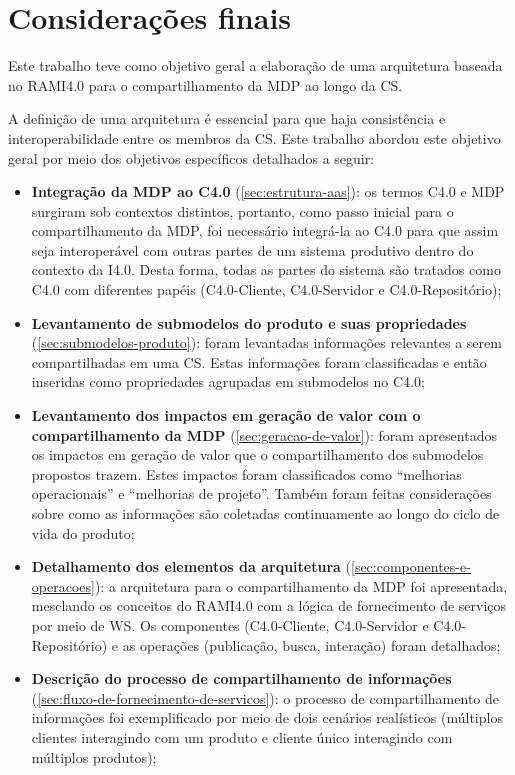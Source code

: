 \chapter{Considerações finais}
\label{cha:conclusao}

Este trabalho teve como objetivo geral a elaboração de uma arquitetura baseada no RAMI4.0 para o compartilhamento da MDP ao longo da CS.

A definição de uma arquitetura é essencial para que haja consistência e interoperabilidade entre os membros da CS. Este trabalho abordou este objetivo geral por meio dos objetivos específicos detalhados a seguir:

\begin{itemize}
	\item \textbf{Integração da MDP ao C4.0} (\autoref{sec:estrutura-aas}): os termos C4.0 e MDP surgiram sob contextos distintos, portanto, como passo inicial para o compartilhamento da MDP, foi necessário integrá-la ao C4.0 para que assim seja interoperável com outras partes de um sistema produtivo dentro do contexto da I4.0. Desta forma, todas as partes do sistema são tratados como C4.0 com diferentes papéis (C4.0-Cliente, C4.0-Servidor e C4.0-Repositório);
	\item \textbf{Levantamento de submodelos do produto e suas propriedades} (\autoref{sec:submodelos-produto}): foram levantadas informações relevantes a serem compartilhadas em uma CS. Estas informações foram classificadas e então inseridas como propriedades agrupadas em submodelos no C4.0;
	\item \textbf{Levantamento dos impactos em geração de valor com o compartilhamento da MDP} (\autoref{sec:geracao-de-valor}): foram apresentados os impactos em geração de valor que o compartilhamento dos submodelos propostos trazem. Estes impactos foram classificados como ``melhorias operacionais'' e ``melhorias de projeto''. Também foram feitas considerações sobre como as informações são coletadas continuamente ao longo do ciclo de vida do produto;
	\item \textbf{Detalhamento dos elementos da arquitetura} (\autoref{sec:componentes-e-operacoes}): a arquitetura para o compartilhamento da MDP foi apresentada, mesclando os conceitos do RAMI4.0 com a lógica de fornecimento de serviços por meio de WS. Os componentes (C4.0-Cliente, C4.0-Servidor e C4.0-Repositório) e as operações (publicação, busca, interação) foram detalhados;
	\item \textbf{Descrição do processo de compartilhamento de informações} (\autoref{sec:fluxo-de-fornecimento-de-servicos}): o processo de compartilhamento de informações foi exemplificado por meio de dois cenários realísticos (múltiplos clientes interagindo com um produto e cliente único interagindo com múltiplos produtos);

\end{itemize}

